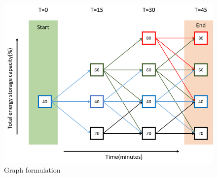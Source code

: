 
\begin{figure}[!h]
\centering
\includegraphics[width = .8\linewidth]{figs/A82/A8_graph_22.png}
\caption{Graph formulation}
\label{fig:F1_1_Dis}
\end{figure}